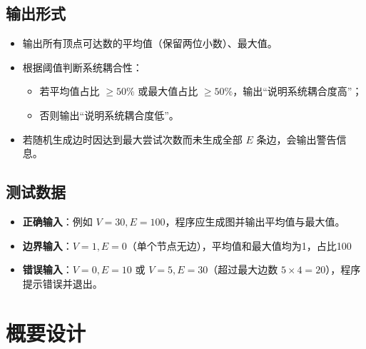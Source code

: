 \documentclass[UTF8]{ctexart}
\begin{document}
\subsection{输出形式}
\begin{itemize}
    \item 输出所有顶点可达数的平均值（保留两位小数）、最大值。
    \item 根据阈值判断系统耦合性：
        \begin{itemize}
            \item 若平均值占比 \(\geq 50\%\) 或最大值占比 \(\geq 50\%\)，输出“说明系统耦合度高”；
            \item 否则输出“说明系统耦合度低”。
        \end{itemize}
    \item 若随机生成边时因达到最大尝试次数而未生成全部 \(E\) 条边，会输出警告信息。
\end{itemize}

\subsection{测试数据}
\begin{itemize}
    \item \textbf{正确输入}：例如 \(V=30, E=100\)，程序应生成图并输出平均值与最大值。
    \item \textbf{边界输入}：\(V=1, E=0\)（单个节点无边），平均值和最大值均为1，占比100%
    \item \textbf{错误输入}：\(V=0, E=10\) 或 \(V=5, E=30\)（超过最大边数 \(5\times4=20\)），程序提示错误并退出。
\end{itemize}

\section{概要设计}
\end{document}
